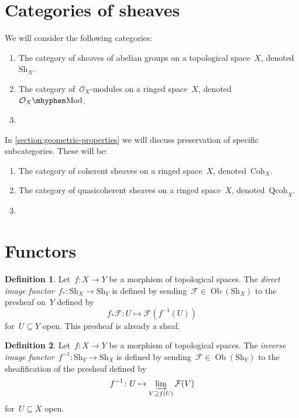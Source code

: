 \documentclass[a4paper,10pt]{article}
\theoremstyle{definition}
\newtheorem{definition}{Definition}
\newcommand\dash{\nobreakdash-\hspace{0pt}}
\newcommand\Coh{\ensuremath{\mathrm{Coh}}}
\newcommand\Qcoh{\ensuremath{\mathrm{Qcoh}}}
\newcommand\Sh{\ensuremath{\mathrm{Sh}}}
\DeclareMathOperator\Ob{Ob}
\begin{document}
\section{Categories of sheaves}
\label{section:categories}
We will consider the following categories:
\begin{enumerate}
  \item The category of sheaves of abelian groups on a topological space~$X$, denoted~$\Sh_X$.
  \item The category of~$\mathcal{O}_X$\dash modules on a ringed space~$X$, denoted~$\Mod{\mathcal{O}_X}$.
  \item {}
\end{enumerate}
In \cref{section:geometric-properties} we will discuss preservation of specific subcategories. These will be:
\begin{enumerate}
  \item The category of coherent sheaves on a ringed space~$X$, denoted~$\Coh_X$.
  \item The category of quasicoherent sheaves on a ringed space~$X$, denoted~$\Qcoh_X$.
  \item {}
\end{enumerate}

\section{Functors}
\label{section:functors}
\begin{definition}
  Let~$f\colon X\to Y$ be a morphism of topological spaces. The \emph{direct image functor}~$f_*\colon\Sh_X\to\Sh_Y$ is defined by sending~$\mathcal{F}\in\Ob(\Sh_X)$ to the presheaf on~$Y$ defined by
  \begin{equation}
    f_*\mathcal{F}\colon U\mapsto\mathcal{F}(f^{-1}(U))
    \label{equation:direct-image-abelian-groups}
  \end{equation}
  for~$U\subseteq Y$ open. This presheaf is already a sheaf.
\end{definition}

\begin{definition}
  Let~$f\colon X\to Y$ be a morphism of topological spaces. The \emph{inverse image functor}~$f^{-1}\colon\Sh_Y\to\Sh_X$ is defined by sending~$\mathcal{F}\in\Ob(\Sh_Y)$ to the sheafification of the presheaf defined by
  \begin{equation}
    f^{-1}\colon U\mapsto\varinjlim_{V\supseteq f(U)}\mathcal{F}(V)
    \label{equation:inverse-image-abelian-groups}
  \end{equation}
  for~$U\subseteq X$ open.
\end{definition}
\end{document}
